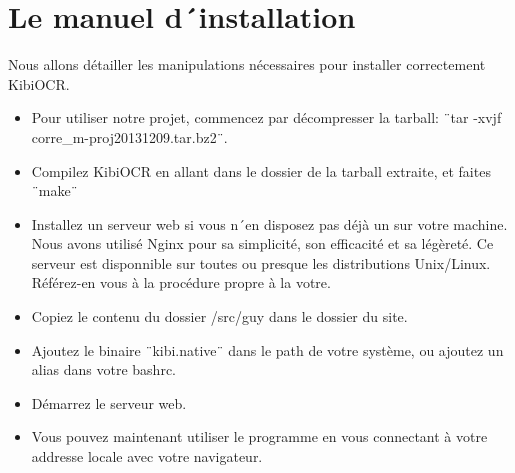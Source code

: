 \chapter{Le manuel d´installation}

Nous allons détailler les manipulations nécessaires pour installer correctement KibiOCR.
\begin{itemize}
  \item{Pour utiliser notre projet, commencez par décompresser la tarball: ¨tar -xvjf corre_m-proj20131209.tar.bz2¨.}
  \item{Compilez KibiOCR en allant dans le dossier de la tarball extraite, et faites ¨make¨}
  \item{Installez un serveur web si vous n´en disposez pas déjà un sur votre machine. Nous avons utilisé Nginx pour sa simplicité, son efficacité et sa légèreté. Ce serveur est disponnible sur toutes ou presque les distributions Unix/Linux. Référez-en vous à la procédure propre à la votre.}
  \item{Copiez le contenu du dossier /src/guy dans le dossier du site.}
  \item{Ajoutez le binaire ¨kibi.native¨ dans le path de votre système, ou ajoutez un alias dans votre bashrc.}
  \item{Démarrez le serveur web.}
  \item{Vous pouvez maintenant utiliser le programme en vous connectant à votre addresse locale avec votre navigateur.}
\end{itemize}
